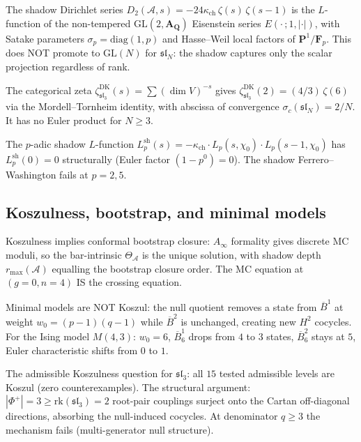 \documentclass[11pt]{article}
\newcommand{\cA}{\mathcal{A}}
\newcommand{\barB}{\overline{B}}
\begin{document}
The shadow Dirichlet series
$D_2(\cA, s) = -24\kappa_{\mathrm{ch}} \, \zeta(s)\,\zeta(s{-}1)$
is the $L$-function of the non-tempered
$\mathrm{GL}(2, \mathbf{A}_{\mathbf{Q}})$ Eisenstein series
$E(\cdot\,; 1, |\cdot|)$, with Satake parameters
$\sigma_p = \mathrm{diag}(1, p)$ and Hasse--Weil local factors
of $\mathbf{P}^1 / \mathbf{F}_p$. This does NOT promote to
$\mathrm{GL}(N)$ for $\mathfrak{sl}_N$: the shadow captures
only the scalar projection regardless of rank.

The categorical zeta
$\zeta^{\mathrm{DK}}_{\mathfrak{sl}_3}(s) = \sum (\dim V)^{-s}$
gives $\zeta^{\mathrm{DK}}_{\mathfrak{sl}_3}(2)
= (4/3)\,\zeta(6)$ via the Mordell--Tornheim identity, with
abscissa of convergence $\sigma_c(\mathfrak{sl}_N) = 2/N$.
It has no Euler product for $N \geq 3$.

The $p$-adic shadow $L$-function
$L_p^{\mathrm{sh}}(s) = -\kappa_{\mathrm{ch}} \cdot L_p(s, \chi_0)
\cdot L_p(s{-}1, \chi_0)$ has $L_p^{\mathrm{sh}}(0) = 0$
structurally (Euler factor $(1 - p^0) = 0$).
The shadow Ferrero--Washington fails at $p = 2, 5$.

\subsection{Koszulness, bootstrap, and minimal models}

Koszulness implies conformal bootstrap closure: $A_\infty$
formality gives discrete MC moduli, so the bar-intrinsic
$\Theta_\cA$ is the unique solution, with shadow depth
$r_{\max}(\cA)$ equalling the bootstrap closure order.
The MC equation at $(g{=}0, n{=}4)$ IS the crossing equation.

Minimal models are NOT Koszul: the null quotient removes a
state from $\barB^1$ at weight $w_0 = (p{-}1)(q{-}1)$ while
$\barB^2$ is unchanged, creating new $H^2$ cocycles. For the
Ising model $M(4,3)$: $w_0 = 6$, $\barB^1_6$ drops from $4$
to $3$ states, $\barB^2_6$ stays at $5$, Euler characteristic
shifts from $0$ to $1$.

The admissible Koszulness question for $\mathfrak{sl}_3$:
all $15$ tested admissible levels are Koszul (zero
counterexamples). The structural argument: $|\Phi^+| = 3
\geq \mathrm{rk}(\mathfrak{sl}_3) = 2$ root-pair couplings
surject onto the Cartan off-diagonal directions, absorbing
the null-induced cocycles. At denominator $q \geq 3$ the
mechanism fails (multi-generator null structure).


%
%
%
\end{document}
